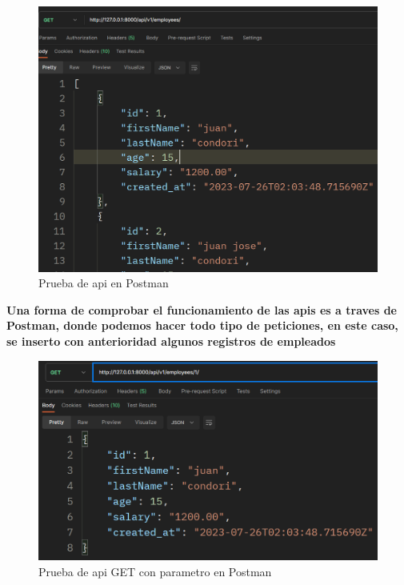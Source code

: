 \documentclass{article}
\begin{document}
        \begin{figure}[ht]
            \centering
            \includegraphics[scale=0.5]{img/img6.png}
            \caption{Prueba de api en Postman}
            \label{fig:enter-label}
        \end{figure}
        \textbf{Una forma de comprobar el funcionamiento de las apis es a traves de Postman, donde podemos hacer todo tipo de peticiones, en este caso, se inserto con anterioridad algunos registros de empleados}
        
        \begin{figure}[ht]
            \centering
            \includegraphics[scale=0.5]{img/img7.png}
            \caption{Prueba de api GET con parametro en Postman}
            \label{fig:enter-label}
        \end{figure}
    \newpage
\end{document}
